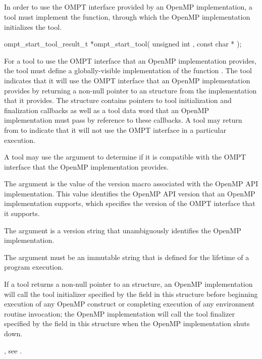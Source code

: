 \subsection{}
\label{sec:ompt_start_tool}

\summary
In order to use the OMPT interface provided by an OpenMP implementation,
a tool must implement the  function, through which 
the OpenMP implementation initializes the tool.

\format
\begin{cspecific}
\begin{omptOther}
ompt_start_tool_result_t *ompt_start_tool(
  unsigned int ,
  const char *
);
\end{omptOther}
\end{cspecific}

\descr
For a tool to use the OMPT interface that an OpenMP implementation provides,
the tool must define a globally-visible implementation of the
function . The tool indicates that it will use the OMPT 
interface that an OpenMP implementation provides by returning a non-null 
pointer to an  structure from the 
 implementation that it provides. The 
 structure contains pointers to tool 
initialization and finalization callbacks as well as a tool data word 
that an OpenMP implementation must pass by reference to these callbacks. 
A tool may return  from  to indicate 
that it will not use the OMPT interface in a particular execution.

A tool may use the  argument to determine if it is 
compatible with the OMPT interface that the OpenMP implementation provides.

\argdesc
The argument  is the value of the  version macro
associated with the OpenMP API implementation. This value identifies the OpenMP 
API version that an OpenMP implementation supports, which specifies the version 
of the OMPT interface that it supports.

The argument  is a version string that unambiguously 
identifies the OpenMP implementation.

\constraints
The argument  must be an immutable string that is defined 
for the lifetime of a program execution.

\effect
If a tool returns a non-null pointer to an  
structure, an OpenMP implementation will call the tool initializer specified 
by the  field in this structure before beginning execution 
of any OpenMP construct or completing execution of any environment routine 
invocation; the OpenMP implementation will call the tool finalizer specified 
by the  field in this structure when the OpenMP implementation 
shuts down.

\begin{crossrefs}
\item {}, see
.
\end{crossrefs}

